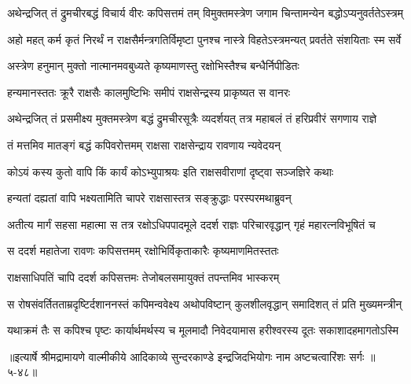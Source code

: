 \twolineshloka
{अथेन्द्रजित् तं द्रुमचीरबद्धं विचार्य वीरः कपिसत्तमं तम्}
{विमुक्तमस्त्रेण जगाम चिन्तामन्येन बद्धोऽप्यनुवर्ततेऽस्त्रम्} %

\twolineshloka
{अहो महत् कर्म कृतं निरर्थं न राक्षसैर्मन्त्रगतिर्विमृष्टा}
{पुनश्च नास्त्रे विहतेऽस्त्रमन्यत् प्रवर्तते संशयिताः स्म सर्वे} %

\twolineshloka
{अस्त्रेण हनुमान् मुक्तो नात्मानमवबुध्यते}
{कृष्यमाणस्तु रक्षोभिस्तैश्च बन्धैर्निपीडितः} %

\twolineshloka
{हन्यमानस्ततः क्रूरै राक्षसैः कालमुष्टिभिः}
{समीपं राक्षसेन्द्रस्य प्राकृष्यत स वानरः} %

\twolineshloka
{अथेन्द्रजित् तं प्रसमीक्ष्य मुक्तमस्त्रेण बद्धं द्रुमचीरसूत्रैः}
{व्यदर्शयत् तत्र महाबलं तं हरिप्रवीरं सगणाय राज्ञे} %

\twolineshloka
{तं मत्तमिव मातङ्गं बद्धं कपिवरोत्तमम्}
{राक्षसा राक्षसेन्द्राय रावणाय न्यवेदयन्} %

\twolineshloka
{कोऽयं कस्य कुतो वापि किं कार्यं कोऽभ्युपाश्रयः}
{इति राक्षसवीराणां दृष्ट्वा सञ्जज्ञिरे कथाः} %

\twolineshloka
{हन्यतां दह्यतां वापि भक्ष्यतामिति चापरे}
{राक्षसास्तत्र सङ्क्रुद्धाः परस्परमथाब्रुवन्} %

\twolineshloka
{अतीत्य मार्गं सहसा महात्मा स तत्र रक्षोऽधिपपादमूले}
{ददर्श राज्ञः परिचारवृद्धान् गृहं महारत्नविभूषितं च} %

\twolineshloka
{स ददर्श महातेजा रावणः कपिसत्तमम्}
{रक्षोभिर्विकृताकारैः कृष्यमाणमितस्ततः} %

\twolineshloka
{राक्षसाधिपतिं चापि ददर्श कपिसत्तमः}
{तेजोबलसमायुक्तं तपन्तमिव भास्करम्} %

\twolineshloka
{स रोषसंवर्तितताम्रदृष्टिर्दशाननस्तं कपिमन्ववेक्ष्य}
{अथोपविष्टान् कुलशीलवृद्धान् समादिशत् तं प्रति मुख्यमन्त्रीन्} %

\twolineshloka
{यथाक्रमं तैः स कपिश्च पृष्टः कार्यार्थमर्थस्य च मूलमादौ}
{निवेदयामास हरीश्वरस्य दूतः सकाशादहमागतोऽस्मि} %


॥इत्यार्षे श्रीमद्रामायणे वाल्मीकीये आदिकाव्ये सुन्दरकाण्डे इन्द्रजिदभियोगः नाम अष्टचत्वारिंशः सर्गः ॥५-४८॥
